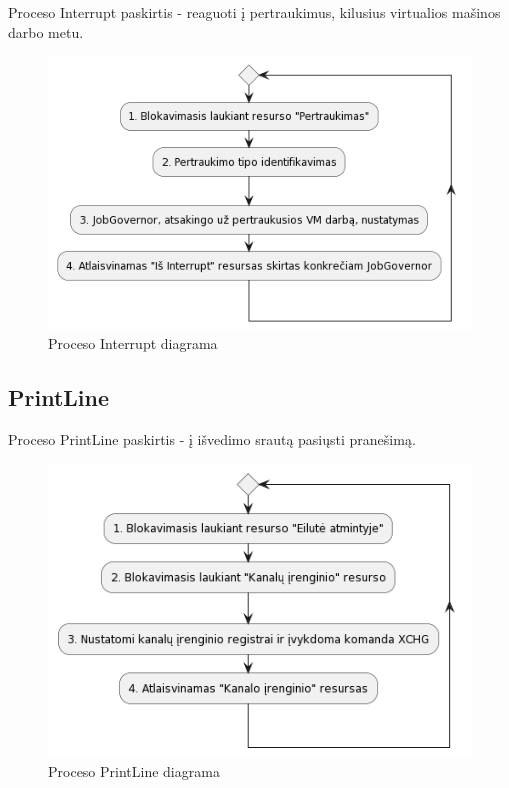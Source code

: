 \documentclass{VUMIFInfKursinis}
\begin{document}
Proceso Interrupt paskirtis - reaguoti į pertraukimus, kilusius virtualios mašinos darbo metu.

\begin{figure}[H]
	\centering	
	\includegraphics[scale=0.65]{img/Interrupt}
	\caption{Proceso Interrupt diagrama}   %
	\label{img:Interrupt}
\end{figure}

\subsection{PrintLine}

Proceso PrintLine paskirtis - į išvedimo srautą pasiųsti pranešimą.

\begin{figure}[H]
	\centering	
	\includegraphics[scale=0.65]{img/PrintLine}
	\caption{Proceso PrintLine diagrama}   %
	\label{img:PrintLine}
\end{figure}
\end{document}
